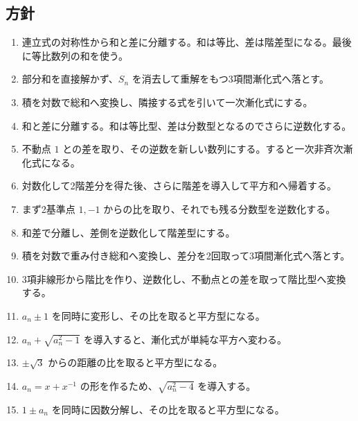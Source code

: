     \subsection{方針}\label{節：高難易度のもの：方針}
      \begin{enumerate}[label=\textbf{問\arabic*.},leftmargin=3.8em,format=\bookitemlink{practice-advanced}{hint}{problem}]
        \item 連立式の対称性から和と差に分離する。和は等比、差は階差型になる。最後に等比数列の和を使う。
        \item 部分和を直接解かず、\(S_n\) を消去して重解をもつ3項間漸化式へ落とす。
        \item 積を対数で総和へ変換し、隣接する式を引いて一次漸化式にする。
        \item 和と差に分離する。和は等比型、差は分数型となるのでさらに逆数化する。
        \item 不動点 \(1\) との差を取り、その逆数を新しい数列にする。すると一次非斉次漸化式になる。
        \item 対数化して2階差分を得た後、さらに階差を導入して平方和へ帰着する。
        \item まず2基準点 \(1,-1\) からの比を取り、それでも残る分数型を逆数化する。
        \item 和差で分離し、差側を逆数化して階差型にする。
        \item 積を対数で重み付き総和へ変換し、差分を2回取って3項間漸化式へ落とす。
        \item 3項非線形から階比を作り、逆数化し、不動点との差を取って階比型へ変換する。
        \item \(a_n\pm1\) を同時に変形し、その比を取ると平方型になる。
        \item \(a_n+\sqrt{a_n^2-1}\) を導入すると、漸化式が単純な平方へ変わる。
        \item \(\pm\sqrt3\) からの距離の比を取ると平方型になる。
        \item \(a_n=x+x^{-1}\) の形を作るため、\(\sqrt{a_n^2-4}\) を導入する。
        \item \(1\pm a_n\) を同時に因数分解し、その比を取ると平方型になる。
      \end{enumerate}

